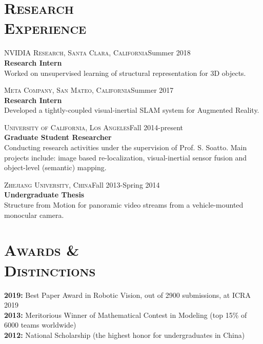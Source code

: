 \documentclass[margin, line, 10pt]{res} %
\begin{document}
\begin{resume}

\section{\textsc{Research\\Experience}}
\textsc{NVIDIA Research, Santa Clara, California}\hfill Summer 2018\\
\textbf{Research Intern}\\
Worked on unsupervised learning of structural representation for 3D objects.

\textsc{Meta Company, San Mateo, California}\hfill Summer 2017\\
\textbf{Research Intern}\\
Developed a tightly-coupled visual-inertial SLAM system for Augmented Reality.

\textsc{University of California, Los Angeles}\hfill Fall 2014-present\\
\textbf{Graduate Student Researcher}\\
Conducting research activities under the supervision of Prof. S. Soatto. Main projects include: image based re-localization, visual-inertial sensor fusion and object-level (semantic) mapping.

\textsc{Zhejiang University, China}\hfill Fall 2013-Spring 2014\\
\textbf{Undergraduate Thesis}\\
Structure from Motion for panoramic video streams from a vehicle-mounted monocular camera.


\section{\textsc{Awards \&\\Distinctions}}
\textbf{2019:} Best Paper Award in Robotic Vision, out of 2900 submissions, at ICRA 2019\\
\textbf{2013:} Meritorious Winner of Mathematical Contest in Modeling (top 15\% of 6000 teams worldwide)\\
\textbf{2012:} National Scholarship (the highest honor for undergraduates in China)

\end{resume}
\end{document}
